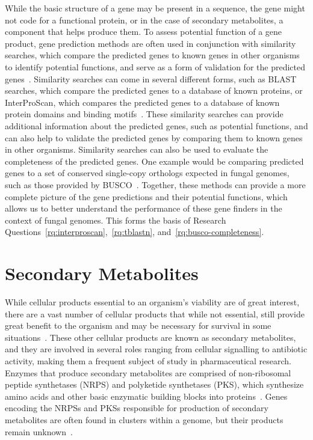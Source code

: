 While the basic structure of a gene may be present in a sequence, the gene might not code for a functional protein, or in the case of secondary metabolites, a component that helps produce them. To assess potential function of a gene product, gene prediction methods are often used in conjunction with similarity searches, which compare the predicted genes to known genes in other organisms to identify potential functions, and serve as a form of validation for the predicted genes~\cite{loftus2003a}. 
Similarity searches can come in several different forms, such as BLAST searches, which compare the predicted genes to a database of known proteins, or InterProScan, which compares the predicted genes to a database of known protein domains and binding motifs~\cite{loftus2003a}. These similarity searches can provide additional information about the predicted genes, such as potential functions, and can also help to validate the predicted genes by comparing them to known genes in other organisms. Similarity searches can also be used to evaluate the completeness of the predicted genes. One example would be comparing predicted genes to a set of conserved single-copy orthologs expected in fungal genomes, such as those provided by BUSCO~\cite{manni2021a}. Together, these methods can provide a more complete picture of the gene predictions and their potential functions, which allows us to better understand the performance of these gene finders in the context of fungal genomes. This forms the basis of Research Questions~\ref{rq:interproscan},~\ref{rq:tblastn}, and~\ref{rq:busco-completeness}.

\section{Secondary Metabolites}\label{lit:secondary-metabolites}

While cellular products essential to an organism's viability are
of great interest, there are a vast number of cellular products that while not
essential, still provide great benefit to the
organism and may be necessary for survival in some situations~\cite{Craney2013, Mukherjee2012}. These other cellular products are known
 as secondary metabolites, and they are involved in several roles ranging 
 from cellular signalling to antibiotic activity, making them a frequent 
 subject of study in pharmaceutical research. Enzymes that produce 
 secondary metabolites are comprised of non-ribosomal peptide synthetases 
 (NRPS) and polyketide synthetases (PKS), which synthesize amino acids and 
 other basic enzymatic building blocks into proteins~\cite{komaki2020}. 
 Genes encoding the NRPSs and PKSs responsible for production of secondary 
 metabolites are often found in clusters within a genome, but their 
 products remain unknown~\cite{Mukherjee2012}. 
 
